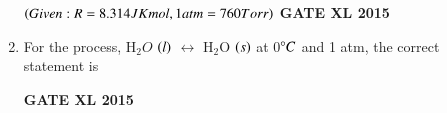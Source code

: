 \documentclass[journal,12pt,onecolumn]{IEEEtran}
\begin{document}
\begin{enumerate}
$\left(Given: R=8.314 JK mol, 1 atm = 760 Torr\right)$
\hfill{\textbf{GATE XL 2015}}
\item For the process, H$_2O$ $\left(l\right)$ $\leftrightarrow$ H$_2$O $\left(s\right)$ at 0$\degree C$ and 1 atm, the correct statement is
    \begin{enumerate}
    \end{enumerate}
\hfill{\textbf{GATE XL 2015}}
	


\end{enumerate}
\end{document}
